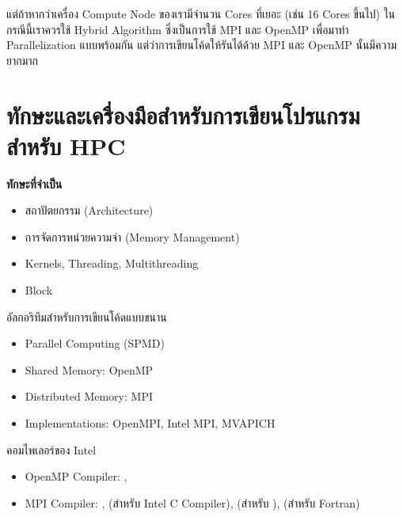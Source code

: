 แต่ถ้าหากว่าเครื่อง Compute Node ของเรามีจำนวน Cores ที่เยอะ (เช่น 16 Cores ขึ้นไป) ในกรณีนี้เราควรใช้ Hybrid Algorithm ซึ่งเป็นการใช้ 
MPI และ OpenMP เพื่อมาทำ Parallelization แบบพร้อมกัน แต่ว่าการเขียนโค้ดให้รันได้ด้วย MPI และ OpenMP นั้นมีความยากมาก

\section{ทักษะและเครื่องมือสำหรับการเขียนโปรแกรมสำหรับ HPC}

\noindent \textbf{ทักษะที่จำเป็น}

\begin{itemize}[topsep=0pt,noitemsep]
  \setlength\itemsep{0.5em}
  \item สถาปัตยกรรม (Architecture)
  
  \item การจัดการหน่วยความจำ (Memory Management)
  
  \item Kernels, Threading, Multithreading
  
  \item Block
\end{itemize}

อัลกอริทึมสำหรับการเขียนโค้ดแบบขนาน

\begin{itemize}[topsep=0pt,noitemsep]
  \setlength\itemsep{0.5em}
  \item Parallel Computing (SPMD)
  
  \item Shared Memory: OpenMP
  
  \item Distributed Memory: MPI
  
  \item Implementations: OpenMPI, Intel MPI, MVAPICH
\end{itemize}

คอมไพเลอร์ของ Intel

\begin{itemize}[topsep=0pt,noitemsep]
  \setlength\itemsep{0.5em} 
  \item OpenMP Compiler: , 
  
  \item MPI Compiler: ,  (สำหรับ Intel C Compiler), 
   (สำหรับ \cpp),  (สำหรับ Fortran)
\end{itemize}

